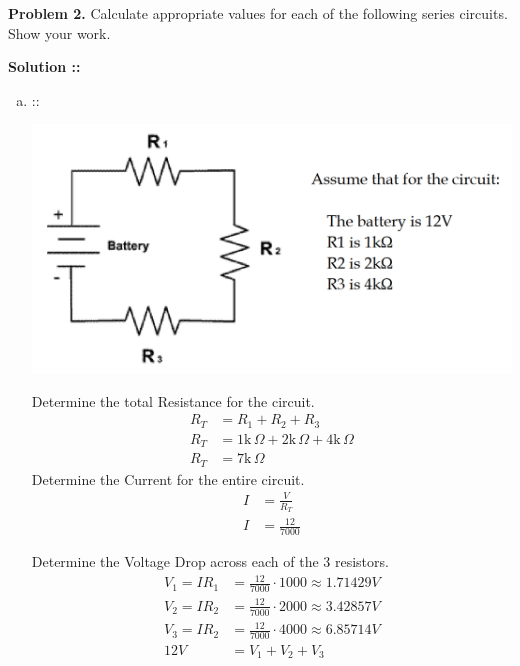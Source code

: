\documentclass[11pt]{article}
\begin{document}
\textbf{Problem 2.} Calculate appropriate values for each of the following series circuits. Show your work.



\vspace{5px}\textbf{Solution ::}
\begin{enumerate}[a)]
\item ::
\begin{center}
    \includegraphics[scale=0.2]{2a.png}
\end{center}
Determine the total Resistance for the circuit.
\begin{align*}
    R_T&=R_1+R_2+R_3 \\
    R_T&=1\text{k}\,\Omega + 2\text{k}\,\Omega + 4\text{k}\,\Omega \\
    R_T&= 7\text{k}\,\Omega
\end{align*}
Determine the Current for the entire circuit.
\begin{align*}
    I &= \frac{V}{R_T} \\
    I &= \frac{12}{7000}
\end{align*}

Determine the Voltage Drop across each of the 3 resistors.
\begin{align*}
    V_1 = IR_1 &= \frac{12}{7000}\cdot1000 \approx 1.71429V \\
    V_2 = IR_2 &= \frac{12}{7000}\cdot2000 \approx 3.42857V \\
    V_3 = IR_2 &= \frac{12}{7000}\cdot4000 \approx 6.85714V \\
    12V &= V_1 + V_2 + V_3
\end{align*}
\pagebreak


\end{enumerate}
\end{document}
